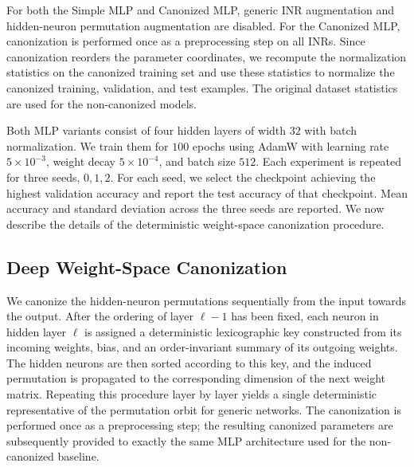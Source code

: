 For both the Simple MLP and Canonized MLP, generic INR augmentation and hidden-neuron permutation augmentation are disabled. For the Canonized MLP, canonization is performed once as a preprocessing step on all INRs. Since canonization reorders the parameter coordinates, we recompute the normalization statistics on the canonized training set and use these statistics to normalize the canonized training, validation, and test examples. The original dataset statistics are used for the non-canonized models.

Both MLP variants consist of four hidden layers of width $32$ with batch normalization. We train them for $100$ epochs using AdamW with learning rate $5\times10^{-3}$, weight decay $5\times10^{-4}$, and batch size $512$. Each experiment is repeated for three seeds, $0,1,2$. For each seed, we select the checkpoint achieving the highest validation accuracy and report the test accuracy of that checkpoint. Mean accuracy and standard deviation across the three seeds are reported. We now describe the details of the deterministic weight-space canonization procedure.

\subsection{Deep Weight-Space Canonization}
\label{app:dws_canonization}

We canonize the hidden-neuron permutations sequentially from the input
towards the output. After the ordering of layer $\ell-1$ has been fixed,
each neuron in hidden layer $\ell$ is assigned a deterministic
lexicographic key constructed from its incoming weights, bias, and an
order-invariant summary of its outgoing weights. The hidden neurons are
then sorted according to this key, and the induced permutation is
propagated to the corresponding dimension of the next weight matrix.
Repeating this procedure layer by layer yields a single deterministic
representative of the permutation orbit for generic networks. The
canonization is performed once as a preprocessing step; the resulting
canonized parameters are subsequently provided to exactly the same MLP
architecture used for the non-canonized baseline.



